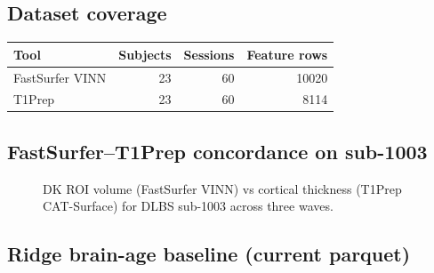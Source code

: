 \documentclass[11pt]{article}
\begin{document}
\subsection{Dataset coverage}



\begin{center}
\begin{tabular}{lrrr}
\toprule
Tool & Subjects & Sessions & Feature rows \\
\midrule
FastSurfer VINN & 23 & 60 & 10020 \\
T1Prep & 23 & 60 & 8114 \\
\bottomrule
\end{tabular}
\end{center}


\subsection{FastSurfer--T1Prep concordance on sub-1003}


\begin{figure}[htpb]
\center
\caption{DK ROI volume (FastSurfer VINN) vs cortical thickness (T1Prep CAT-Surface) for DLBS sub-1003 across three waves.}
\label{fig:concordance_fig}
\end{figure}


\subsection{Ridge brain-age baseline (current parquet)}
\end{document}
